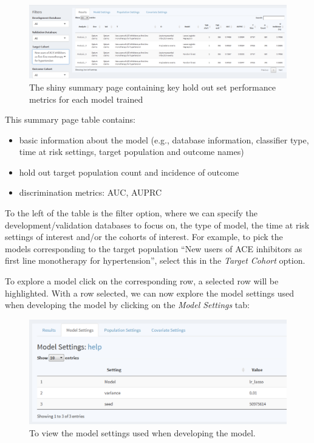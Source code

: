 \documentclass[11pt]{book}
\providecommand{\tightlist}{%
  \setlength{\itemsep}{0pt}\setlength{\parskip}{0pt}}
\theoremstyle{definition}
\theoremstyle{definition}
\theoremstyle{definition}
\theoremstyle{remark}
\begin{document}
\begin{figure}

{\centering \includegraphics[width=1\linewidth]{images/PatientLevelPrediction/shiny/shinyFilter} 

}

\caption{The shiny summary page containing key hold out set performance metrics for each model trained}\label{fig:multiShinySummary}
\end{figure}

This summary page table contains:

\begin{itemize}
\tightlist
\item
  basic information about the model (e.g., database information, classifier type, time at risk settings, target population and outcome names)
\item
  hold out target population count and incidence of outcome
\item
  discrimination metrics: AUC, AUPRC
\end{itemize}

To the left of the table is the filter option, where we can specify the development/validation databases to focus on, the type of model, the time at risk settings of interest and/or the cohorts of interest. For example, to pick the models corresponding to the target population ``New users of ACE inhibitors as first line monotherapy for hypertension'', select this in the \emph{Target Cohort} option.

To explore a model click on the corresponding row, a selected row will be highlighted. With a row selected, we can now explore the model settings used when developing the model by clicking on the \emph{Model Settings} tab:

\begin{figure}

{\centering \includegraphics[width=1\linewidth]{images/PatientLevelPrediction/shiny/shinyModel} 

}

\caption{To view the model settings used when developing the model.}\label{fig:shinyModel}
\end{figure}
\end{document}
